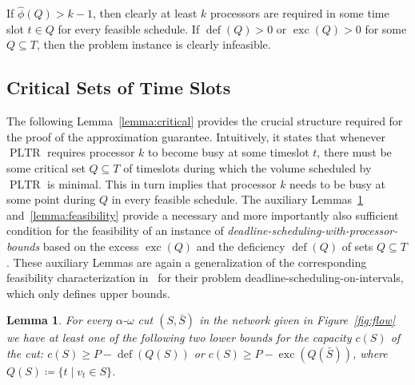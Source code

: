 \documentclass[a4paper]{article}
\DeclareMathOperator{\PLTR}{PLTR}
\DeclareMathOperator{\opdef}{def}
\DeclareMathOperator{\exc}{exc}
\newtheorem{lemma}[theorem]{Lemma}
\begin{document}
If $\hat \phi(Q) > k - 1$, then clearly at least $k$ processors are required in some time slot $t \in Q$ for every feasible schedule.
If $\opdef(Q) > 0$ or $\exc(Q) > 0$ for some $Q \subseteq T$, then the problem instance is clearly infeasible.


\subsection{Critical Sets of Time Slots}
The following Lemma~\ref{lemma:critical} provides the crucial structure required for the proof of the approximation guarantee.
Intuitively, it states that whenever $\PLTR$ requires processor $k$ to become busy at some timeslot $t$, there must be some critical set $Q \subseteq T$ of timeslots during which the volume scheduled by $\PLTR$ is minimal.
This in turn implies that processor $k$ needs to be busy at some point during $Q$ in every feasible schedule.
The auxiliary Lemmas~\ref{lemma:cut} and~\ref{lemma:feasibility} provide a necessary and more importantly also sufficient condition for the feasibility of an instance of \emph{deadline-scheduling-with-processor-bounds} based on the excess $\exc(Q)$ and the deficiency $\opdef(Q)$ of sets $Q \subseteq T$.
These auxiliary Lemmas are again a generalization of the corresponding feasibility characterization in~\cite{antoniadis} for their problem deadline-scheduling-on-intervals, which only defines upper bounds.
\begin{lemma}\label{lemma:cut}
  For every $\alpha$-$\omega$ cut $(S, \bar S)$ in the network given in Figure~\ref{fig:flow} we have at least one of the following two lower bounds for the capacity $c(S)$ of the cut:
  $c(S) \geq P - \opdef(Q(S))$ or $c(S) \geq P - \exc(Q(\bar S))$, where $Q(S) \coloneqq \{ t \mid v_t \in S \}$.
\end{lemma}
\end{document}
